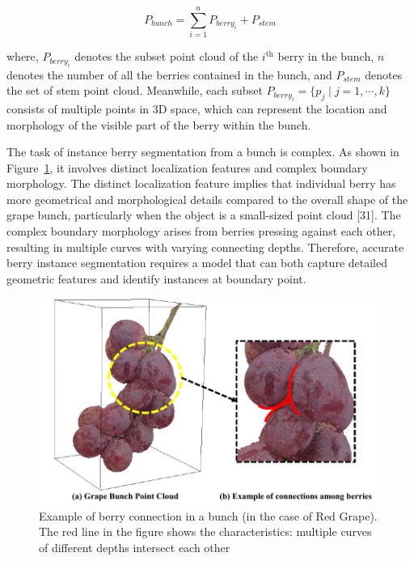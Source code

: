 \documentclass[12pt]{article}
\begin{document}
\begin{equation}
P_{bunch} = \sum_{i=1}^{n} P_{berry_{i}} + P_{stem}
\label{eq:1}
\end{equation}

{\raggedright where, $P_{berry_{i}}$ denotes the subset point cloud of the $i^{\text{th}}$ berry in the bunch, $n$ denotes the number of all the berries contained in the bunch, and $P_{stem}$ denotes the set of stem point cloud. 
Meanwhile, each subset $P_{berry_{i}}=\{p_j \mid j=1, \cdots, k\}$ consists of multiple points in 3D space, which can represent the location and morphology of the visible part of the berry within the bunch.}

The task of instance berry segmentation from a bunch is complex. 
As shown in Figure~\ref{fig:raw2}, it involves distinct localization features and complex boundary morphology. 
The distinct localization feature implies that individual berry has more geometrical and morphological details compared to the overall shape of the grape bunch, particularly when the object is a small-sized point cloud [31]. 
The complex boundary morphology arises from berries pressing against each other, resulting in multiple curves with varying connecting depths. 
Therefore, accurate berry instance segmentation requires a model that can both capture detailed geometric features and identify instances at boundary point. 

\begin{figure}[hbt!]
    \centering
    \includegraphics[width=1\textwidth]{figures/Figure5.pdf}
    \caption{Example of berry connection in a bunch (in the case of Red Grape). The red line in the figure shows the characteristics: multiple curves of different depths intersect each other}
    \label{fig:raw2}
\end{figure}
\end{document}
